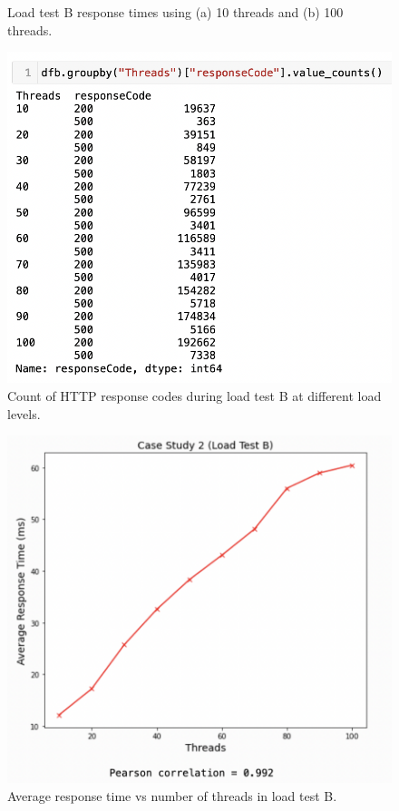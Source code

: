 \begin{figure}[H]
  \centering
  \caption{Load test B response times using (a) 10 threads and (b) 100 threads.}
  \label{fig:cs02-ltb-12}
\end{figure}

\begin{figure}[H]
  \centering
  \includegraphics[width=0.6\linewidth]{./assets/images/case-studies/cs02-ltb-3.png}
  \caption{Count of HTTP response codes during load test B at different load levels.}
  \label{fig:cs02-ltb-3}
\end{figure}

\begin{figure}[H]
  \centering
  \includegraphics[width=0.55\linewidth]{./assets/images/case-studies/cs02-ltb-4.png}
  \caption{Average response time vs number of threads in load test B.}
  \label{fig:cs02-ltb-4}
\end{figure}
